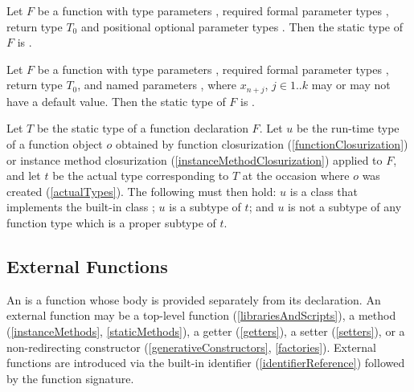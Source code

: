 \documentclass[makeidx]{article}
\begin{document}
\LMHash{}%
Let $F$ be a function with
type parameters \TypeParametersStd,
required formal parameter types ,
return type $T_0$
and positional optional parameter types .
Then the static type of $F$ is
.

\LMHash{}%
Let $F$ be a function with
type parameters \TypeParametersStd,
required formal parameter types ,
return type $T_0$,
and named parameters ,
where $x_{n+j}$, $j \in 1 .. k$ may or may not have a default value.
Then the static type of $F$ is
.

\LMHash{}%
Let $T$ be the static type of a function declaration $F$.
Let $u$ be the run-time type of a function object $o$ obtained by
function closurization
(\ref{functionClosurization})
or instance method closurization
(\ref{instanceMethodClosurization})
applied to $F$,
and let $t$ be the actual type corresponding to $T$
at the occasion where $o$ was created
(\ref{actualTypes}).
The following must then hold:
$u$ is a class that implements the built-in class \FUNCTION;
$u$ is a subtype of $t$;
and $u$ is not a subtype of any function type which is a proper subtype of $t$.



\subsection{External Functions}

\LMHash{}%
An 
is a function whose body is provided separately from its declaration.
An external function may be
a top-level function (\ref{librariesAndScripts}),
a method (\ref{instanceMethods}, \ref{staticMethods}),
a getter (\ref{getters}),
a setter (\ref{setters}),
or a non-redirecting constructor
(\ref{generativeConstructors}, \ref{factories}).
External functions are introduced via the built-in identifier \EXTERNAL{}
(\ref{identifierReference})
followed by the function signature.
\end{document}
